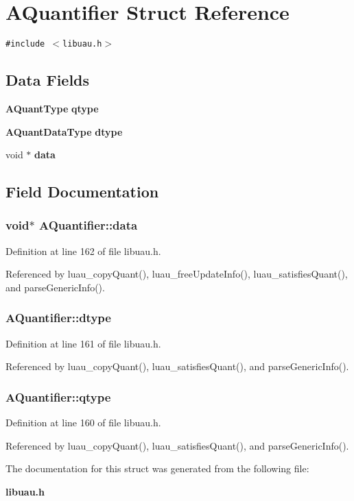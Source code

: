\section{AQuantifier Struct Reference}
\label{structAQuantifier}
{\tt \#include $<$libuau.h$>$}

\subsection*{Data Fields}
\begin{CompactItemize}
\item 
{\bf AQuant\-Type} {\bf qtype}
\item 
{\bf AQuant\-Data\-Type} {\bf dtype}
\item 
void $\ast$ {\bf data}
\end{CompactItemize}


\subsection{Field Documentation}
\subsubsection{\setlength{\rightskip}{0pt plus 5cm}void$\ast$ {\bf AQuantifier::data}}\label{structAQuantifier_o2}




Definition at line 162 of file libuau.h.

Referenced by luau\_\-copy\-Quant(), luau\_\-free\-Update\-Info(), luau\_\-satisfies\-Quant(), and parse\-Generic\-Info().
\subsubsection{ {\bf AQuantifier::dtype}}\label{structAQuantifier_o1}




Definition at line 161 of file libuau.h.

Referenced by luau\_\-copy\-Quant(), luau\_\-satisfies\-Quant(), and parse\-Generic\-Info().
\subsubsection{ {\bf AQuantifier::qtype}}\label{structAQuantifier_o0}




Definition at line 160 of file libuau.h.

Referenced by luau\_\-copy\-Quant(), luau\_\-satisfies\-Quant(), and parse\-Generic\-Info().

The documentation for this struct was generated from the following file:\begin{CompactItemize}
\item 
{\bf libuau.h}\end{CompactItemize}
